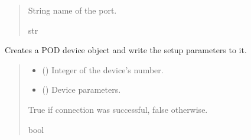 \documentclass[letterpaper,10pt,english]{sphinxmanual}
\begin{document}
\begin{fulllineitems}
\begin{fulllineitems}
\begin{quote}
\begin{description}
\sphinxAtStartPar
String name of the port.

\sphinxAtStartPar
str

\end{description}\end{quote}

\end{fulllineitems}


\begin{fulllineitems}
\label{\detokenize{Setup.SetupOneDevice:Setup.SetupOneDevice.Setup_PodInterface.SetupInterface._ConnectPODdevice}}
\pysigstartsignatures
{}
\pysigstopsignatures
\sphinxAtStartPar
Creates a POD device object and write the setup parameters to it.
\begin{quote}\begin{description}
\begin{itemize}
\item {} 
\sphinxAtStartPar
{} () \textendash{} Integer of the device’s number.

\item {} 
\sphinxAtStartPar
{} () \textendash{} Device parameters.

\end{itemize}

\sphinxAtStartPar
True if connection was successful, false otherwise.

\sphinxAtStartPar
bool

\end{description}\end{quote}

\end{fulllineitems}


\end{fulllineitems}
\end{document}
